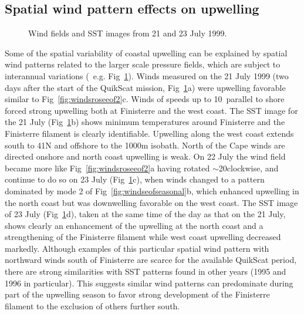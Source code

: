 \subsection{Spatial wind pattern effects on upwelling}
\begin{figure}
\centering \noindent {}
 
\caption{ Wind fields and SST images from 21 and 23 July
1999.}\label{fig:windssst2123}
\end{figure}
Some of the spatial variability of coastal upwelling can be
explained by spatial wind patterns related to the larger scale
pressure fields, which are subject to interannual variations
(~e.g. {Fig~\ref{fig:windssst2123}}). Winds measured on the 21
July 1999 (two days after the start of the QuikScat mission,
Fig~\ref{fig:windssst2123}a) were upwelling favorable similar to
Fig~\ref{fig:windsroseeof2}c. Winds of speeds up to 10\vel\,
parallel to shore forced strong upwelling both at Finisterre and
the west coast. The SST image for the 21 July
(Fig~\ref{fig:windssst2123}b) shows minimum temperatures around
Finisterre and the Finisterre filament is clearly identifiable.
Upwelling along the west coast extends south to 41\deg N and
offshore to the 1000m isobath. North of the Cape winds are
directed onshore and north coast upwelling is weak. On 22 July the
wind field became more like Fig~\ref{fig:windsroseeof2}a having
rotated $\sim$20\deg clockwise, and continue to do so on 23 July
(Fig~\ref{fig:windssst2123}c), when winds changed to a pattern
dominated by mode 2 of Fig~\ref{fig:windseofseasonal}b, which
enhanced upwelling in the north coast but was downwelling
favorable on the west coast. The SST image of 23 July
(Fig~\ref{fig:windssst2123}d), taken at the same time of the day
as that on the 21 July, shows clearly an enhancement of the
upwelling at the north coast and a strengthening of the Finisterre
filament while west coast upwelling decreased markedly. Although
examples of this particular spatial wind pattern with northward
winds south of Finisterre are scarce for the available QuikScat
period, there are strong similarities with SST patterns found in
other years (1995 and 1996 in particular). This suggests similar
wind patterns can predominate during part of the upwelling season
to favor strong development of the Finisterre filament to the
exclusion of others further south.
